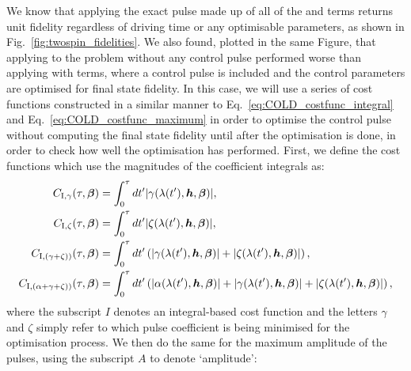 We know that applying the exact  pulse made up of all of the  and   terms returns unit fidelity regardless of driving time or any optimisable parameters, as shown in Fig.~\ref{fig:twospin_fidelities}. We also found, plotted in the same Figure, that applying   to the problem without any control pulse performed worse than applying  with  terms, where a control pulse is included and the control parameters are optimised for final state fidelity. In this case, we will use a series of cost functions constructed in a similar manner to Eq.~\eqref{eq:COLD_costfunc_integral} and Eq.~\eqref{eq:COLD_costfunc_maximum} in order to optimise the  control pulse without computing the final state fidelity until after the optimisation is done, in order to check how well the optimisation has performed. First, we define the cost functions which use the magnitudes of the coefficient integrals as:
 \begin{equation}\label{eq:twospin_costfunc_int}
    \begin{aligned}
        C_{\rm I, \gamma}(\tau, \boldsymbol{\beta}) &= \int_{0}^{\tau} dt^{\prime} |\gamma(\lambda(t^{\prime}), \boldsymbol{h}, \boldsymbol{\beta})|,\\
        C_{\rm I, \zeta}(\tau, \boldsymbol{\beta}) &= \int_{0}^{\tau} dt^{\prime} |\zeta(\lambda(t^{\prime}), \boldsymbol{h}, \boldsymbol{\beta})|,\\
        C_{\rm I, (\gamma + \zeta))}(\tau, \boldsymbol{\beta}) &= \int_{0}^{\tau} dt^{\prime} \left(|\gamma(\lambda(t^{\prime}), \boldsymbol{h}, \boldsymbol{\beta})| + |\zeta(\lambda(t^{\prime}), \boldsymbol{h}, \boldsymbol{\beta})|\right), \\
        C_{\rm I, (\alpha + \gamma + \zeta))}(\tau, \boldsymbol{\beta}) &= \int_{0}^{\tau} dt^{\prime} \left(|\alpha(\lambda(t^{\prime}), \boldsymbol{h}, \boldsymbol{\beta})| + |\gamma(\lambda(t^{\prime}), \boldsymbol{h}, \boldsymbol{\beta})| + |\zeta(\lambda(t^{\prime}), \boldsymbol{h}, \boldsymbol{\beta})|\right),
    \end{aligned}
\end{equation}
where the subscript $I$ denotes an integral-based cost function and the letters $\gamma$ and $\zeta$ simply refer to which pulse coefficient is being minimised for the optimisation process. We then do the same for the maximum amplitude of the pulses, using the subscript $A$ to denote `amplitude':
